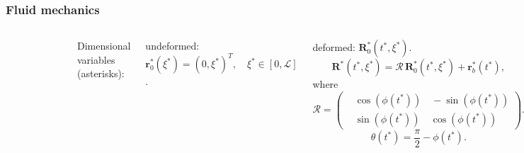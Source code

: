 \documentclass{beamer}
\begin{document}
\begin{frame}
	\frametitle{Fluid mechanics}
	\begin{overlayarea}{\textwidth}{\textheight}
		\begin{columns}
		\begin{figure}[htb]
			\begin{center}
				\includegraphics[width=1\textwidth]{plots/r0.png}
			\end{center}
		\end{figure}
		Dimensional variables (asterisks): 
		
		undeformed: $\mathbf{r}_0^*(\xi^*)=(0,\xi^*)^T, \quad  \xi^*\in [0,\mathcal{L}]$.
		
		deformed: $\mathbf{R}_0^*(t^*,\xi^*)$.	
			\begin{equation*}
			\mathbf{R}^*(t^*,\xi^*)=\mathbf{\mathcal{R}}\,\mathbf{R}_0^*(t^*,\xi^*)+\mathbf{r}_b^*(t^*),
		\end{equation*}
		where $$\mathbf{\mathcal{R}}=\left(\begin{aligned}
				&\cos(\phi(t^*))\quad -\sin(\phi(t^*)) \\
				&\sin(\phi(t^*))\quad \cos(\phi(t^*))
			\end{aligned}\right).$$
		\normalsize \begin{equation*}
			\theta(t^*)=\frac{\pi}{2}-\phi(t^*).
		\end{equation*}
		\end{columns}
	\end{overlayarea}
\end{frame}
\end{document}
